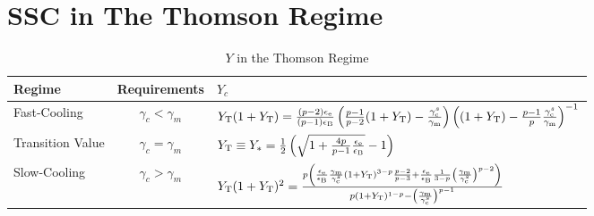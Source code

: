 \documentclass[fleqn,usenatbib]{mnras}
\begin{document}
\section{SSC in The Thomson Regime}\label{SSCT}


\begin{table}
\caption{$Y$ in the Thomson Regime}
\begin{tabular}{lcl}
\hline
Regime&Requirements&$Y_{c}$\\
\hline
\label{tab:Yt}
Fast-Cooling &$\gamma_{c} < \gamma_{m}$ &$ Y_{\rm T}(1+Y_{\rm T}) = \frac{(p-2)\epsilon_{\rm e}}{(p-1)\epsilon_{\rm B}}\left(\frac{p-1}{p-2}(1+Y_{\rm T})-\frac{\gamma_{\rm c}^s}{\gamma_{\rm m}}\right)\left((1+Y_{\rm T})-\frac{p-1}{p}\frac{\gamma_{\rm c}^s}{\gamma_{\rm m}}\right)^{-1}$ \\
Transition Value & $\gamma_{c}=\gamma_{m} $&$ Y_{\rm T}\equiv Y_* =\frac{1}{2}\left(\sqrt{1+\frac{4p}{p-1}\frac{\epsilon_{\rm e}}{\epsilon_{\rm B}}}-1\right)$ \\
Slow-Cooling & $\gamma_{c} > \gamma_{m}$ & $Y_{\rm T}(1+Y_{\rm T})^2 = \frac{p\left(\frac{\epsilon_{\rm e}}{\epsilon_{\rm B}}\frac{\gamma_{\rm m}}{\gamma_{\rm c}^s}(1+Y_{\rm T})^{3-p}\frac{p-2}{p-3}+\frac{\epsilon_{\rm e}}{\epsilon_{\rm B}}\frac{1}{3-p}\left(\frac{\gamma_{\rm m}}{\gamma_{\rm c}^s}\right)^{p-2}\right)}{ p(1+Y_{\rm T})^{1-p}-\left(\frac{\gamma_{\rm m}}{\gamma_{\rm c}^s}\right)^{p-1}}$\\
\hline
\end{tabular}
\end{table}
\end{document}
